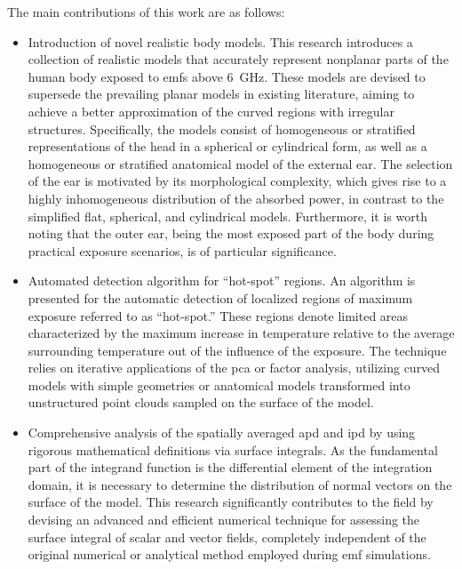 The main contributions of this work are as follows:
\begin{itemize}
    \item Introduction of novel realistic body models.
    This research introduces a collection of realistic models that accurately represent nonplanar parts of the human body exposed to \gls{emf}s above \SI{6}{\GHz}.
    These models are devised to supersede the prevailing planar models in existing literature, aiming to achieve a better approximation of the curved regions with irregular structures.
    Specifically, the models consist of homogeneous or stratified representations of the head in a spherical or cylindrical form, as well as a homogeneous or stratified anatomical model of the external ear.
    The selection of the ear is motivated by its morphological complexity, which gives rise to a highly inhomogeneous distribution of the absorbed power, in contrast to the simplified flat, spherical, and cylindrical models. Furthermore, it is worth noting that the outer ear, being the most exposed part of the body during practical exposure scenarios, is of particular significance.
    \item Automated detection algorithm for ``hot-spot'' regions.
    An algorithm is presented for the automatic detection of localized regions of maximum exposure referred to as ``hot-spot.''
    These regions denote limited areas characterized by the maximum increase in temperature relative to the average surrounding temperature out of the influence of the exposure.
    The technique relies on iterative applications of the \gls{pca} or factor analysis, utilizing curved models with simple geometries or anatomical models transformed into unstructured point clouds sampled on the surface of the model.
    \item Comprehensive analysis of the spatially averaged \gls{apd} and \gls{ipd}  by using rigorous mathematical definitions via surface integrals.
    As the fundamental part of the integrand function is the differential element of the integration domain, it is necessary to determine the distribution of normal vectors on the surface of the model. 
    This research significantly contributes to the field by devising an advanced and efficient numerical technique for assessing the surface integral of scalar and vector fields, completely independent of the original numerical or analytical method employed during \gls{emf} simulations.
\end{itemize}

